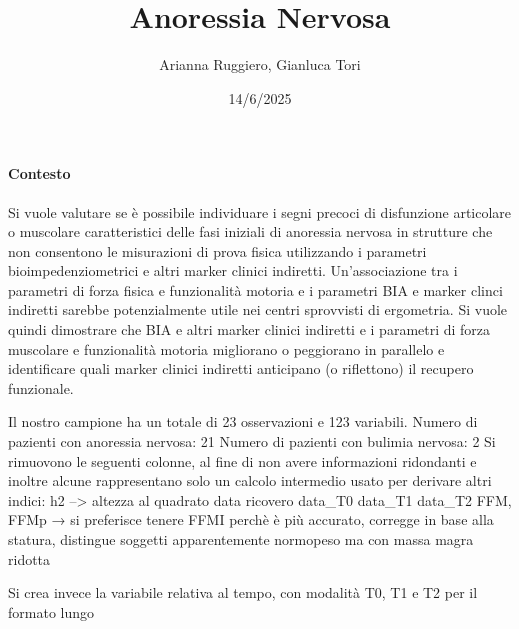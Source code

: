 \documentclass[
]{article}
\title{Anoressia Nervosa}
\author{Arianna Ruggiero, Gianluca Tori}
\date{14/6/2025}
\begin{document}
\maketitle

\paragraph{Contesto}\label{contesto}

Si vuole valutare se è possibile individuare i segni precoci di
disfunzione articolare o muscolare caratteristici delle fasi iniziali di
anoressia nervosa in strutture che non consentono le misurazioni di
prova fisica utilizzando i parametri bioimpedenziometrici e altri marker
clinici indiretti. Un'associazione tra i parametri di forza fisica e
funzionalità motoria e i parametri BIA e marker clinci indiretti sarebbe
potenzialmente utile nei centri sprovvisti di ergometria. Si vuole
quindi dimostrare che BIA e altri marker clinici indiretti e i parametri
di forza muscolare e funzionalità motoria migliorano o peggiorano in
parallelo e identificare quali marker clinici indiretti anticipano (o
riflettono) il recupero funzionale.

Il nostro campione ha un totale di 23 osservazioni e 123 variabili.
Numero di pazienti con anoressia nervosa: 21 Numero di pazienti con
bulimia nervosa: 2 Si rimuovono le seguenti colonne, al fine di non
avere informazioni ridondanti e inoltre alcune rappresentano solo un
calcolo intermedio usato per derivare altri indici: h2 --\textgreater{}
altezza al quadrato data ricovero data\_T0 data\_T1 data\_T2 FFM, FFMp →
si preferisce tenere FFMI perchè è più accurato, corregge in base alla
statura, distingue soggetti apparentemente normopeso ma con massa magra
ridotta

Si crea invece la variabile relativa al tempo, con modalità T0, T1 e T2
per il formato lungo
\end{document}
